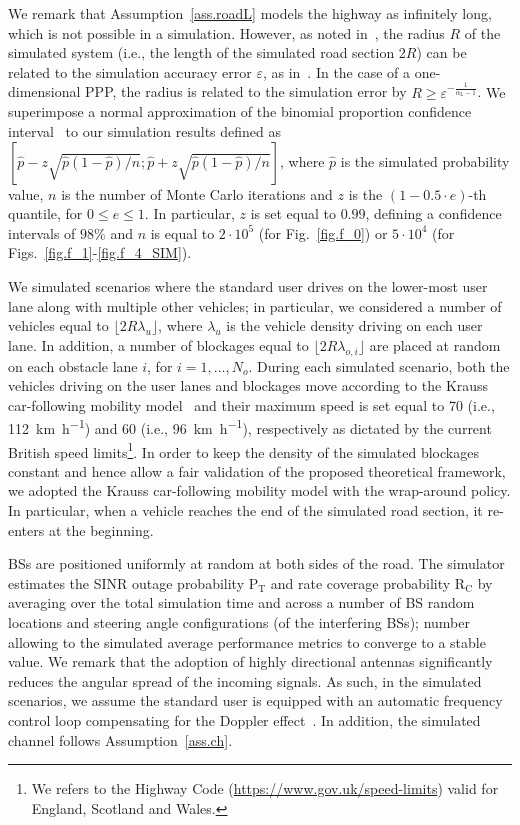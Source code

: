 \documentclass[10pt,journal,a4paper]{IEEEtran}
\begin{document}
We remark that Assumption~\ref{ass.roadL} models the highway as infinitely long, which is not possible in a simulation. However, as noted in~\cite{NET-015,weber2005computational}, the radius $R$ of the simulated system (i.e., the length of the simulated road section $2R$) can be related to the simulation accuracy error $\varepsilon$, as in~\cite[Eq.~(3.5)]{NET-015}. In the case of a one-dimensional PPP, the radius is related to the simulation error by $R \geq \varepsilon^{-\frac{1}{\alpha_\mathrm{L} - 1}}$. {We superimpose a normal approximation of the binomial proportion confidence interval~\cite{ryan2007modern} to our simulation results defined as $\left[ \hat{p} - z \sqrt{{\hat{p}(1-\hat{p})/n}}; \hat{p} + z \sqrt{{\hat{p}(1-\hat{p})/n}} \right]$, where $\hat{p}$ is the simulated probability value, $n$ is the number of Monte Carlo iterations and $z$ is the $(1-0.5 \cdot e)$-th quantile, for $0 \leq e \leq 1$. In particular, $z$ is set equal to $0.99$, defining a confidence intervals of $98\%$ and $n$ is equal to $2 \cdot 10^5$ (for Fig.~\ref{fig.f_0}) or $5 \cdot 10^4$ (for Figs.~\ref{fig.f_1}-\ref{fig.f_4_SIM}).}

We simulated scenarios where the standard user drives on the lower-most user lane along with multiple other vehicles; in particular, we considered a number of vehicles equal to $\lfloor2R\lambda_u\rfloor$, where $\lambda_u$ is the vehicle density driving on each user lane. In addition, a number of blockages equal to $\lfloor 2R\lambda_{o,i}\rfloor$ are placed at random on each obstacle lane $i$, for $i = 1, \ldots, N_o$. During each simulated scenario, both the vehicles driving on the user lanes and blockages move according to the Krauss car-following mobility model~\cite{Kanagaraj2013390} and their maximum speed is set equal to \SI{70}{\mph} (i.e., \SI{112}{\kilo\meter\per\hour}) and \SI{60}{\mph} (i.e., \SI{96}{\kilo\meter\per\hour}), respectively as dictated by the current British speed limits\footnote{We refers to the Highway Code (\url{https://www.gov.uk/speed-limits}) valid for England, Scotland and Wales.}. In order to keep the density of the simulated blockages constant and hence allow a fair validation of the proposed theoretical framework, we adopted the Krauss car-following mobility model with the wrap-around policy. In particular, when a vehicle reaches the end of the simulated road section, it re-enters at the beginning.

BSs are positioned uniformly at random at both sides of the road.
The simulator estimates the SINR outage probability $\mathrm{P_T}$ and rate coverage probability $\mathrm{R_C}$ by averaging over the total simulation time and across a number of BS random locations and steering angle configurations (of the interfering BSs); number allowing to the simulated average performance metrics to converge to a stable value.
We remark that the adoption of highly directional antennas significantly reduces the angular spread of the incoming signals. As such, in the simulated scenarios, we assume the standard user is equipped with an automatic frequency control loop compensating for the Doppler effect~\cite{5783993}.
In addition, the simulated channel follows Assumption~\ref{ass.ch}.
\end{document}
